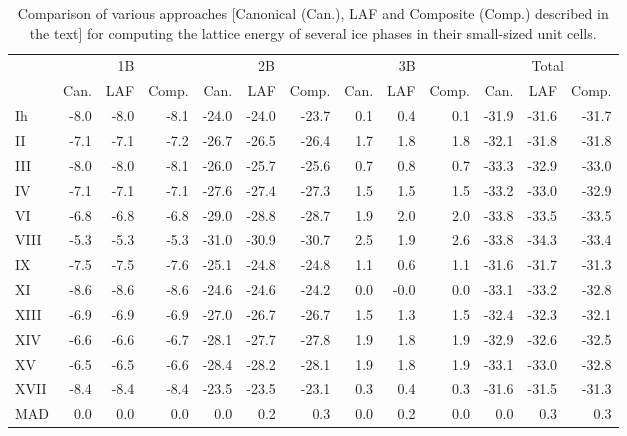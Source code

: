\begin{table}[h]

\caption{\label{tab:canonical_cheaper}Comparison of various approaches [Canonical (Can.), LAF and Composite (Comp.) described in the text] for computing the lattice energy of several ice phases in their small-sized unit cells.}
\begin{tabular}{lrrrrrrrrrrrr}
\toprule
 & \multicolumn{3}{c}{1B} & \multicolumn{3}{c}{2B} & \multicolumn{3}{c}{3B} & \multicolumn{3}{c}{Total} \\ \cmidrule(lr){2-4} \cmidrule(lr){5-7} \cmidrule(lr){8-10} \cmidrule(lr){11-13} 
 & Can. & LAF & Comp. & Can. & LAF & Comp. & Can. & LAF & Comp. & Can. & LAF & Comp. \\
\midrule
Ih & -8.0 & -8.0 & -8.1 & -24.0 & -24.0 & -23.7 & 0.1 & 0.4 & 0.1 & -31.9 & -31.6 & -31.7 \\
II & -7.1 & -7.1 & -7.2 & -26.7 & -26.5 & -26.4 & 1.7 & 1.8 & 1.8 & -32.1 & -31.8 & -31.8 \\
III & -8.0 & -8.0 & -8.1 & -26.0 & -25.7 & -25.6 & 0.7 & 0.8 & 0.7 & -33.3 & -32.9 & -33.0 \\
IV & -7.1 & -7.1 & -7.1 & -27.6 & -27.4 & -27.3 & 1.5 & 1.5 & 1.5 & -33.2 & -33.0 & -32.9 \\
VI & -6.8 & -6.8 & -6.8 & -29.0 & -28.8 & -28.7 & 1.9 & 2.0 & 2.0 & -33.8 & -33.5 & -33.5 \\
VIII & -5.3 & -5.3 & -5.3 & -31.0 & -30.9 & -30.7 & 2.5 & 1.9 & 2.6 & -33.8 & -34.3 & -33.4 \\
IX & -7.5 & -7.5 & -7.6 & -25.1 & -24.8 & -24.8 & 1.1 & 0.6 & 1.1 & -31.6 & -31.7 & -31.3 \\
XI & -8.6 & -8.6 & -8.6 & -24.6 & -24.6 & -24.2 & 0.0 & -0.0 & 0.0 & -33.1 & -33.2 & -32.8 \\
XIII & -6.9 & -6.9 & -6.9 & -27.0 & -26.7 & -26.7 & 1.5 & 1.3 & 1.5 & -32.4 & -32.3 & -32.1 \\
XIV & -6.6 & -6.6 & -6.7 & -28.1 & -27.7 & -27.8 & 1.9 & 1.8 & 1.9 & -32.9 & -32.6 & -32.5 \\
XV & -6.5 & -6.5 & -6.6 & -28.4 & -28.2 & -28.1 & 1.9 & 1.8 & 1.9 & -33.1 & -33.0 & -32.8 \\
XVII & -8.4 & -8.4 & -8.4 & -23.5 & -23.5 & -23.1 & 0.3 & 0.4 & 0.3 & -31.6 & -31.5 & -31.3 \\
\midrule MAD & 0.0 & 0.0 & 0.0 & 0.0 & 0.2 & 0.3 & 0.0 & 0.2 & 0.0 & 0.0 & 0.3 & 0.3 \\
\bottomrule
\end{tabular}

\end{table}